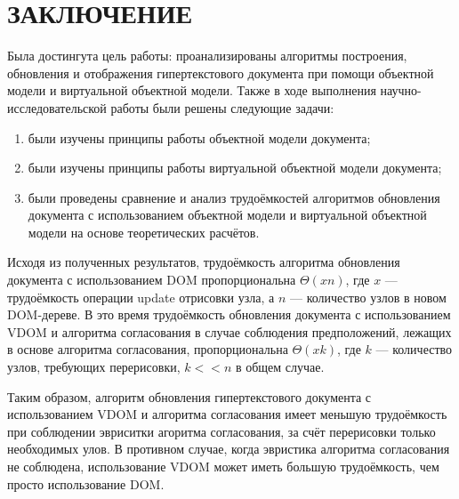 \section*{ЗАКЛЮЧЕНИЕ}

Была достингута цель работы: проанализированы алгоритмы построения, обновления и отображения гипертекстового документа при помощи объектной модели и виртуальной объектной модели.
Также в ходе выполнения научно-исследовательской работы были решены следующие задачи: 
\begin{enumerate}[label=\arabic*)]
	\item были изучены принципы работы объектной модели документа;
	\item были изучены принципы работы виртуальной объектной модели документа;
	\item были проведены сравнение и анализ трудоёмкостей алгоритмов обновления документа с использованием объектной модели и виртуальной объектной модели на основе теоретических расчётов.
\end{enumerate}

Исходя из полученных результатов, трудоёмкость алгоритма обновления документа с использованием DOM пропорциональна $\Theta(xn)$, где $x$ --- трудоёмкость операции update отрисовки узла, а $n$ --- количество узлов в новом DOM-дереве.
В это время трудоёмкость обновления документа с использованием VDOM и алгоритма согласования в случае соблюдения предположений, лежащих в основе алгоритма согласования, пропорциональна $\Theta(xk)$, где $k$ --- количество узлов, требующих перерисовки, $k << n$ в общем случае.

Таким образом, алгоритм обновления гипертекстового документа с использованием VDOM и алгоритма согласования имеет меньшую трудоёмкость при соблюдении эвриситки агоритма согласования, за счёт перерисовки только необходимых улов.
В противном случае, когда эвристика алгоритма согласования не соблюдена, использование VDOM может иметь большую трудоёмкость, чем просто использование DOM.

\pagebreak